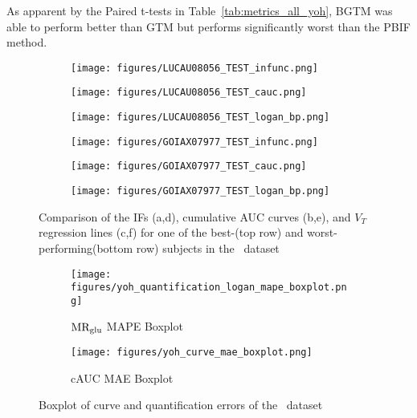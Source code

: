 As apparent by the Paired t-tests in Table~\ref{tab:metrics_all_yoh}, BGTM was able to perform better than GTM but performs significantly worst than the PBIF method.

\begin{figure}[h]
	\centering
	\begin{subfigure}[b]{0.322\textwidth}
		\texttt{[image: figures/LUCAU08056\_TEST\_infunc.png]}
		\caption{}
	\end{subfigure}
	\begin{subfigure}[b]{0.322\textwidth}
		\texttt{[image: figures/LUCAU08056\_TEST\_cauc.png]}
		\caption{}
	\end{subfigure}
	\begin{subfigure}[b]{0.322\textwidth}
		\texttt{[image: figures/LUCAU08056\_TEST\_logan\_bp.png]}
		\caption{}
	\end{subfigure}
	\begin{subfigure}[b]{0.322\textwidth}
		\texttt{[image: figures/GOIAX07977\_TEST\_infunc.png]}
		\caption{}
	\end{subfigure}
	\begin{subfigure}[b]{0.322\textwidth}
		\texttt{[image: figures/GOIAX07977\_TEST\_cauc.png]}
		\caption{}
	\end{subfigure}
	\begin{subfigure}[b]{0.322\textwidth}
		\texttt{[image: figures/GOIAX07977\_TEST\_logan\_bp.png]}
		\caption{}
	\end{subfigure}
	\caption{Comparison of the IFs (a,d), cumulative AUC curves (b,e), and $V_T$ regression lines (c,f) for one of the best-(top row) and worst-performing(bottom row) subjects in the \yohimbine\ dataset}
	\label{fig:yoh_ifs}
\end{figure}

\begin{figure}[h]
	\centering
	\begin{subfigure}[b]{0.45\textwidth}
		\texttt{[image: figures/yoh\_quantification\_logan\_mape\_boxplot.png]}
		\caption{\(\text{MR}_{\text{glu}}\) MAPE Boxplot}
		\label{subfig:yoh_mape_boxplot}
	\end{subfigure}
	\begin{subfigure}[b]{0.45\textwidth}
		\texttt{[image: figures/yoh\_curve\_mae\_boxplot.png]}
		\caption{cAUC MAE Boxplot}
		\label{subfig:yoh_cauc_boxplot}
	\end{subfigure}
	\caption{Boxplot of curve and quantification errors of the \yohimbine\ dataset}
	\label{fig:yoh_boxplots}
\end{figure}



